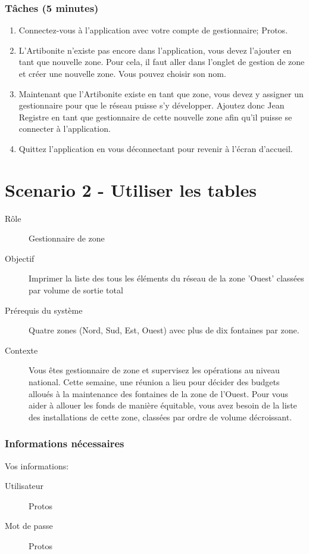 \documentclass[a4paper, 11pt]{article}
\begin{document}
    \subsubsection*{Tâches (5 minutes)}
        \begin{enumerate}
            \item Connectez-vous à l'application avec votre compte de gestionnaire; Protos.
            \item L’Artibonite n’existe pas encore dans l'application, vous devez l’ajouter en tant que nouvelle zone. Pour cela, il faut aller dans l’onglet de gestion de zone et créer une nouvelle zone. Vous pouvez choisir son nom.
            \item Maintenant que l’Artibonite existe en tant que zone, vous devez y assigner un gestionnaire pour que le réseau puisse s’y développer. Ajoutez donc Jean Registre en tant que gestionnaire de cette nouvelle zone afin qu’il puisse se connecter à l’application.
            \item Quittez l’application en vous déconnectant pour revenir à l’écran d’accueil.
        \end{enumerate}
\newpage

\section*{Scenario 2 - Utiliser les tables}
    \begin{description}
        \item[Rôle] Gestionnaire de zone
        \item[Objectif] Imprimer la liste des tous les éléments du réseau de la zone 'Ouest' classées par volume de sortie total
        \item[Prérequis du système] Quatre zones (Nord, Sud, Est, Ouest) avec plus de dix fontaines par zone.
        \item[Contexte] Vous êtes gestionnaire de zone et supervisez les opérations au niveau national. Cette semaine, une réunion a lieu pour décider des budgets alloués à la maintenance des fontaines de la zone de l'Ouest. Pour vous aider à allouer les fonds de manière équitable, vous avez besoin de la liste des installations de cette zone, classées par ordre de volume décroissant.
    \end{description}

    \subsubsection*{Informations nécessaires}
        Vos informations:
        \begin{description}
            \item[Utilisateur] Protos
            \item[Mot de passe] Protos
        \end{description}
\end{document}
